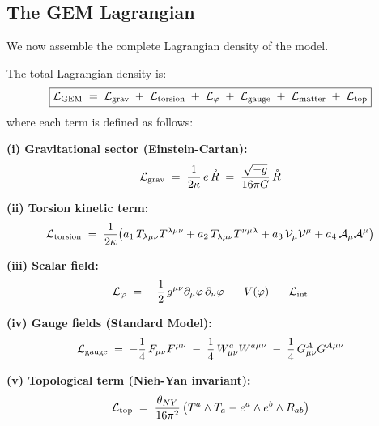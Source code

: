 \subsection{The GEM Lagrangian}

We now assemble the complete Lagrangian density of the model.

\begin{definition}
The total Lagrangian density is:
\begin{equation}
\boxed{
    \mathcal{L}_{\text{GEM}} \;=\; \mathcal{L}_{\text{grav}} \;+\; \mathcal{L}_{\text{torsion}} \;+\; \mathcal{L}_{\varphi} \;+\; \mathcal{L}_{\text{gauge}} \;+\; \mathcal{L}_{\text{matter}} \;+\; \mathcal{L}_{\text{top}}
}
\end{equation}
where each term is defined as follows:

\textbf{(i) Gravitational sector (Einstein-Cartan):}
\begin{equation}
    \mathcal{L}_{\text{grav}} \;=\; \frac{1}{2\kappa}\, e\, \mathring{R} \;=\; \frac{\sqrt{-g}}{16\pi G}\, \mathring{R}
\end{equation}

\textbf{(ii) Torsion kinetic term:}
\begin{equation}
    \mathcal{L}_{\text{torsion}} \;=\; \frac{1}{2\kappa}\big( a_1\, T_{\lambda\mu\nu}T^{\lambda\mu\nu} + a_2\, T_{\lambda\mu\nu}T^{\nu\mu\lambda} + a_3\, \mathcal{V}_\mu \mathcal{V}^\mu + a_4\, \mathcal{A}_\mu \mathcal{A}^\mu \big)
\end{equation}

\textbf{(iii) Scalar field:}
\begin{equation}
    \mathcal{L}_{\varphi} \;=\; -\frac{1}{2}\,g^{\mu\nu}\partial_\mu \varphi\, \partial_\nu \varphi \;-\; V(\varphi) \;+\; \mathcal{L}_{\text{int}}
\end{equation}

\textbf{(iv) Gauge fields (Standard Model):}
\begin{equation}
    \mathcal{L}_{\text{gauge}} \;=\; -\frac{1}{4}\, F_{\mu\nu}F^{\mu\nu} \;-\; \frac{1}{4}\, W^a_{\mu\nu}W^{a\mu\nu} \;-\; \frac{1}{4}\, G^A_{\mu\nu}G^{A\mu\nu}
\end{equation}

\textbf{(v) Topological term (Nieh-Yan invariant):}
\begin{equation}
    \mathcal{L}_{\text{top}} \;=\; \frac{\theta_{NY}}{16\pi^2}\, \big(T^a \wedge T_a - e^a \wedge e^b \wedge R_{ab}\big)
\end{equation}
\end{definition}

